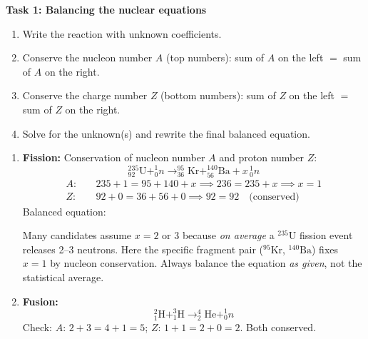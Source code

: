 \documentclass[11pt]{article}
\newcommand{\cle}[1]{{\popxbold\color{popdark}#1}}
\newcounter{popsec}
\newcounter{popsub}
\newcommand{\courssub}[1]{%
  \stepcounter{popsub}%
  \par\vspace{9pt}\noindent{\popxbold\fontsize{11.5}{13}\selectfont\color{popink}{\color{poporange}\thepopsec.\thepopsub}\hspace{6pt}#1}\par\nopagebreak\vspace{4pt}
}
\begin{document}
\courssub{Model answer}

\textbf{Task 1: Balancing the nuclear equations}

\begin{methode}
\begin{enumerate}
    \item Write the reaction with unknown coefficients.
    \item Conserve the \cle{nucleon number} $A$ (top numbers): sum of $A$ on the left $=$ sum of $A$ on the right.
    \item Conserve the \cle{charge number} $Z$ (bottom numbers): sum of $Z$ on the left $=$ sum of $Z$ on the right.
    \item Solve for the unknown(s) and rewrite the final balanced equation.
\end{enumerate}
\end{methode}

\begin{enumerate}
    \item \textbf{Fission:} Conservation of nucleon number $A$ and proton number $Z$:
    \[
    ^{235}_{92}\mathrm{U} + ^{1}_{0}n \rightarrow ^{95}_{36}\mathrm{Kr} + ^{140}_{56}\mathrm{Ba} + x\,^{1}_{0}n
    \]
    \begin{align*}
        A:&\quad 235 + 1 = 95 + 140 + x \implies 236 = 235 + x \implies \boxed{x = 1} \\
        Z:&\quad 92 + 0 = 36 + 56 + 0 \implies 92 = 92 \quad \text{(conserved)}
    \end{align*}
    Balanced equation:
    \begin{center}
    \end{center}
    \begin{attention}
    Many candidates assume $x=2$ or $3$ because \emph{on average} a $^{235}\mathrm{U}$ fission event releases 2--3 neutrons. Here the specific fragment pair ($^{95}\mathrm{Kr}$, $^{140}\mathrm{Ba}$) fixes $x=1$ by nucleon conservation. Always balance the equation \emph{as given}, not the statistical average.
    \end{attention}

    \item \textbf{Fusion:}
    \[
    ^{2}_{1}\mathrm{H} + ^{3}_{1}\mathrm{H} \rightarrow ^{4}_{2}\mathrm{He} + ^{1}_{0}n
    \]
    Check: $A$: $2+3 = 4+1 = 5$; $Z$: $1+1 = 2+0 = 2$. Both conserved.
\end{enumerate}
\end{document}
